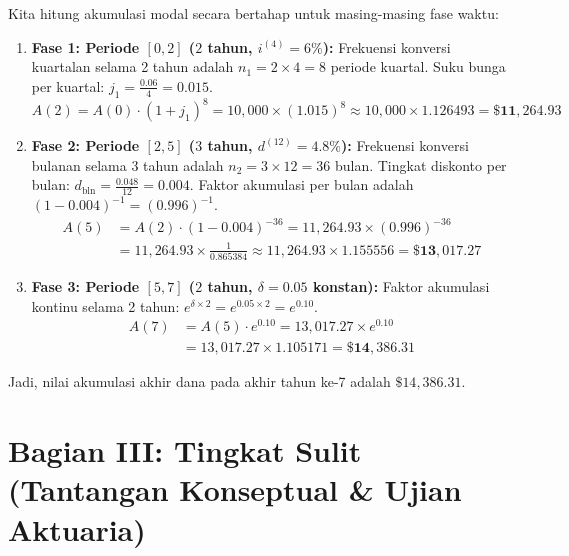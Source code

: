 \documentclass[11pt,a4paper]{article}
\begin{document}
\begin{solutionbox}[Soal 6]
Kita hitung akumulasi modal secara bertahap untuk masing-masing fase waktu:
\begin{enumerate}[leftmargin=1.5em]
    \item \textbf{Fase 1: Periode $[0, 2]$ ($2$ tahun, $i^{(4)} = 6\%$):}
    Frekuensi konversi kuartalan selama 2 tahun adalah $n_1 = 2 \times 4 = 8$ periode kuartal.
    Suku bunga per kuartal: $j_1 = \frac{0.06}{4} = 0.015$.
    \begin{equation*}
        A(2) = A(0) \cdot (1 + j_1)^8 = 10{,}000 \times (1.015)^8 \approx 10{,}000 \times 1.126493 = \mathbf{\$11{,}264.93}
    \end{equation*}

    \item \textbf{Fase 2: Periode $[2, 5]$ ($3$ tahun, $d^{(12)} = 4.8\%$):}
    Frekuensi konversi bulanan selama 3 tahun adalah $n_2 = 3 \times 12 = 36$ bulan.
    Tingkat diskonto per bulan: $d_{\text{bln}} = \frac{0.048}{12} = 0.004$.
    Faktor akumulasi per bulan adalah $(1 - 0.004)^{-1} = (0.996)^{-1}$.
    \begin{align*}
        A(5) &= A(2) \cdot (1 - 0.004)^{-36} = 11{,}264.93 \times (0.996)^{-36} \\
             &= 11{,}264.93 \times \frac{1}{0.865384} \approx 11{,}264.93 \times 1.155556 = \mathbf{\$13{,}017.27}
    \end{align*}

    \item \textbf{Fase 3: Periode $[5, 7]$ ($2$ tahun, $\delta = 0.05$ konstan):}
    Faktor akumulasi kontinu selama 2 tahun: $e^{\delta \times 2} = e^{0.05 \times 2} = e^{0.10}$.
    \begin{align*}
        A(7) &= A(5) \cdot e^{0.10} = 13{,}017.27 \times e^{0.10} \\
             &= 13{,}017.27 \times 1.105171 = \mathbf{\$14{,}386.31}
    \end{align*}
\end{enumerate}
Jadi, nilai akumulasi akhir dana pada akhir tahun ke-7 adalah \textbf{$\$14{,}386.31$}.
\end{solutionbox}

\newpage
\section*{Bagian III: Tingkat Sulit (Tantangan Konseptual \& Ujian Aktuaria)}
\end{document}
